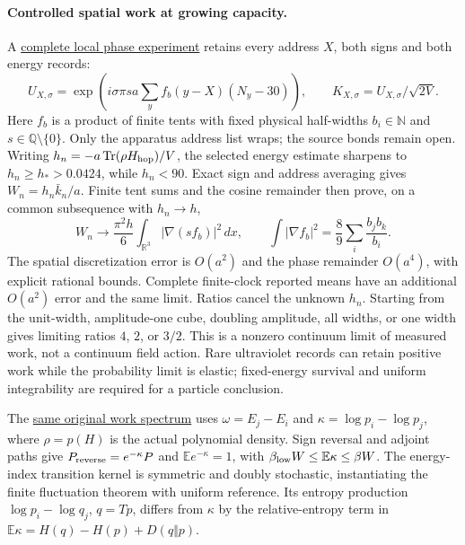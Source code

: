 \paragraph{Controlled spatial work at growing capacity.}
A \href{https://github.com/FloatingPragma/observer-patch-holography/blob/main/model/particle_primary_critical_refinement/PROOF.md}{complete local phase experiment}
retains every address $X$, both signs and both energy records:
\[
 U_{X,\sigma}=\exp\!\left(i\sigma\pi s a
   \sum_y f_b(y-X)(N_y-30)\right),\qquad
 K_{X,\sigma}=U_{X,\sigma}/\sqrt{2V}.
\]
Here $f_b$ is a product of finite tents with fixed physical half-widths
$b_i\in\mathbb N$ and $s\in\mathbb Q\setminus\{0\}$.
Only the apparatus address list wraps; the source bonds remain open.
Writing $h_n=-a\operatorname{Tr}(\rho H_{\rm hop})/V$, the selected
energy estimate sharpens to $h_n\ge h_*>0.0424$, while $h_n<90$.
Exact sign and address averaging gives $W_n=h_n\bar k_n/a$.
Finite tent sums and the cosine remainder then prove, on a common
subsequence with $h_n\to h$,
\[
 W_n\longrightarrow\frac{\pi^2h}{6}
     \int_{\mathbb R^3}|\nabla(sf_b)|^2\,dx,\qquad
 \int|\nabla f_b|^2=\frac89\sum_i\frac{b_jb_k}{b_i}.
\]
The spatial discretization error is $O(a^2)$ and the phase remainder
$O(a^4)$, with explicit rational bounds. Complete finite-clock reported
means have an additional $O(a^2)$ error and the same limit.
Ratios cancel the unknown $h_n$. Starting from the unit-width,
amplitude-one cube, doubling amplitude, all widths, or one width gives
limiting ratios $4$, $2$, or $3/2$.
This is a nonzero continuum limit of measured work, not a continuum
field action. Rare ultraviolet records can retain positive work while
the probability limit is elastic; fixed-energy survival and uniform
integrability are required for a particle conclusion.

The \href{https://github.com/FloatingPragma/observer-patch-holography/blob/main/model/particle_primary_work_spectrum/PROOF.md}{same original work spectrum}
uses $\omega=E_j-E_i$ and $\kappa=\log p_i-\log p_j$, where
$\rho=p(H)$ is the actual polynomial density. Sign reversal and
adjoint paths give $P_{\rm reverse}=e^{-\kappa}P$ and
$\mathbb E e^{-\kappa}=1$, with
$\beta_{\rm low}W\le\mathbb E\kappa\le\beta W$.
The energy-index transition kernel is symmetric and doubly stochastic,
instantiating the finite fluctuation theorem with uniform reference.
Its entropy production $\log p_i-\log q_j$, $q=Tp$, differs from
$\kappa$ by the relative-entropy term in
$\mathbb E\kappa=H(q)-H(p)+D(q\Vert p)$.

